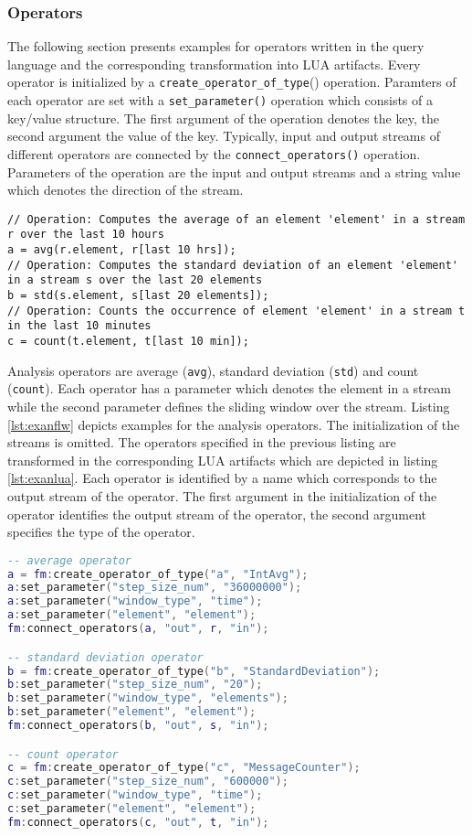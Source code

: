 \subsubsection{Operators}
The following section presents examples for operators written in the query 
language and the corresponding  transformation into LUA artifacts. Every 
operator is initialized by a \texttt{create\_operator\_of\_type}() operation. 
Paramters of each operator are set with a \texttt{set\_param\-eter()} operation 
which consists of a key/value structure. The first argument of the operation
denotes the key, the second argument the value of the key. Typically, input and
output streams of different operators are connected by the 
\texttt{connect\_operators()} operation. Parameters of the operation are the 
input and output streams and a string value which denotes the direction of the 
stream. 
\begin{lstlisting}[language=Flow, caption={\emph{Examples of Analysis Operators in Flow}},label={lst:exanflw}]
// Operation: Computes the average of an element 'element' in a stream r over the last 10 hours
a = avg(r.element, r[last 10 hrs]);
// Operation: Computes the standard deviation of an element 'element' in a stream s over the last 20 elements
b = std(s.element, s[last 20 elements]);
// Operation: Counts the occurrence of element 'element' in a stream t in the last 10 minutes
c = count(t.element, t[last 10 min]);
\end{lstlisting}
Analysis operators are average (\texttt{avg}), standard deviation (\texttt{std})
and count (\texttt{count}). Each operator has a parameter which denotes the 
element in a stream while the second parameter defines the sliding window over
the stream. Listing \ref{lst:exanflw} depicts examples for the analysis 
operators. The initialization of the streams is omitted. The operators 
specified in the previous listing are transformed in the corresponding LUA 
artifacts which are depicted in listing \ref{lst:exanlua}. Each operator is 
identified by a name which corresponds to the output stream of the operator. 
The first argument in the initialization of the operator identifies the output
stream of the operator, the second argument specifies the type of the operator. 
\begin{lstlisting}[language=Lua, caption={\emph{Examples of Analysis Operators in LUA}},label={lst:exanlua}]
-- average operator
a = fm:create_operator_of_type("a", "IntAvg");
a:set_parameter("step_size_num", "36000000");
a:set_parameter("window_type", "time");
a:set_parameter("element", "element");
fm:connect_operators(a, "out", r, "in");

-- standard deviation operator
b = fm:create_operator_of_type("b", "StandardDeviation");
b:set_parameter("step_size_num", "20");
b:set_parameter("window_type", "elements");
b:set_parameter("element", "element");
fm:connect_operators(b, "out", s, "in");

-- count operator
c = fm:create_operator_of_type("c", "MessageCounter");
c:set_parameter("step_size_num", "600000");
c:set_parameter("window_type", "time");
c:set_parameter("element", "element");
fm:connect_operators(c, "out", t, "in");
\end{lstlisting}
